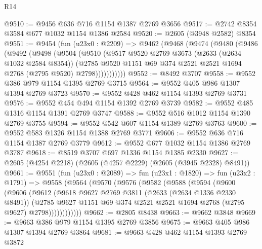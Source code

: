 \begin{lexlean}{R14}
\begin{coremodule}
@9510 := @9456 @636 @716 @1154 @1387 @2769 @3656
@9517 := @2742 @8354 @3584 @677 @1032 @1154 @1386 @2584
@9520 := @2605 (@3948 @2582) @8354
@9551 := @9454
    (fun (u23x0 : @2209) =>
    @9462
      (@9468
        (@9474
          (@9480
            (@9486
              (@9492
                (@9498
                  (@9504
                    (@9510
                      (@9517
                        @9520
                        @2769
                        @3673
                        (@2633 (@2634 @1032 @2584 @8354))
                        (@2785
                          @9520
                          @1151
                          @69
                          @374
                          @2521
                          @2521
                          @1694
                          @2768
                          (@2795 @9520)
                          @2798)))))))))))
@9552 := @8492 @3707
@9558 := @9552 @386 @979 @1154 @1395 @2769 @3715
@9564 := @9552 @405 @986 @1307 @1394 @2769 @3723
@9570 := @9552 @428 @462 @1154 @1393 @2769 @3731
@9576 := @9552 @454 @494 @1154 @1392 @2769 @3739
@9582 := @9552 @485 @1316 @1154 @1391 @2769 @3747
@9588 := @9552 @516 @1012 @1154 @1390 @2769 @3755
@9594 := @9552 @542 @607 @1154 @1389 @2769 @3763
@9600 := @9552 @583 @1326 @1154 @1388 @2769 @3771
@9606 := @9552 @636 @716 @1154 @1387 @2769 @3779
@9612 := @9552 @677 @1032 @1154 @1386 @2769 @3787
@9618 := @8519 @3707 @697 @1336 @1154 @1385 @2330
@9627 := @2605 (@4254 @2218) (@2605 (@4257 @2229) (@2605 (@3945 @2328) @8491))
@9661 := @9551
    (fun (u23x0 : @2089) =>
    fun (u23x1 : @1820) =>
    fun (u23x2 : @1791) =>
    @9558
      (@9564
        (@9570
          (@9576
            (@9582
              (@9588
                (@9594
                  (@9600
                    (@9606
                      (@9612
                        (@9618
                          @9627
                          @2769
                          @3811
                          (@2633 (@2634 @1336 @2330 @8491))
                          (@2785
                            @9627
                            @1151
                            @69
                            @374
                            @2521
                            @2521
                            @1694
                            @2768
                            (@2795 @9627)
                            @2798))))))))))))
@9662 := @2805 @8438
@9663 := @9662 @3848
@9669 := @9663 @386 @979 @1154 @1395 @2769 @3856
@9675 := @9663 @405 @986 @1307 @1394 @2769 @3864
@9681 := @9663 @428 @462 @1154 @1393 @2769 @3872

\end{coremodule}
\end{lexlean}
